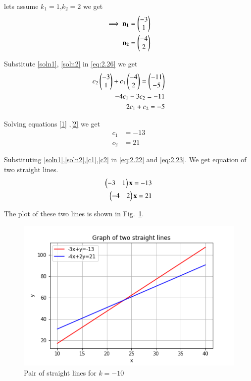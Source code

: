 \documentclass[journal,12pt,twocolumn]{IEEEtran}
\begin{document}
lets assume $k_1=1$,$k_2=2$ we get
\begin{align}
    \implies\mathbf{n_1}=\begin{pmatrix}-3\\1\end{pmatrix}\label{soln1}\\
    \mathbf{n_2}=\begin{pmatrix}-4\\2\end{pmatrix}\label{soln2}
\end{align}

Substitute \eqref{soln1}, \eqref{soln2} in \eqref{eq:2.26} we get 
\begin{align}
    c_2\begin{pmatrix}-3\\1\end{pmatrix}+c_1\begin{pmatrix}-4\\2\end{pmatrix}=\begin{pmatrix} -11\\ -5\end{pmatrix}\\
    -4c_1-3c_2=-11\label{1}\\
    2c_1+c_2=-5\label{2}
\end{align}

Solving equations \eqref{1} ,\eqref{2} we get 
\begin{align}
    c_1&=-13\label{c1}\\
    c_2&=21\label{c2}
\end{align}

Substituting \eqref{soln1},\eqref{soln2},\eqref{c1},\eqref{c2} in \eqref{eq:2.22} and \eqref{eq:2.23}. We get equation of two straight lines.
\begin{align}
    \begin{pmatrix}-3 & 1\end{pmatrix}\mathbf{x}=-13\\
    \begin{pmatrix}-4 & 2\end{pmatrix}\mathbf{x}=21
\end{align}

The plot of these two lines is shown in Fig.~\ref{fig:figure1}.
\begin{figure}[ht!]
    \centering
    \includegraphics[width=\columnwidth]{Figure1}
    \caption{Pair of straight lines for $k=-10$}
    \label{fig:figure1}
\end{figure}
\end{document}
